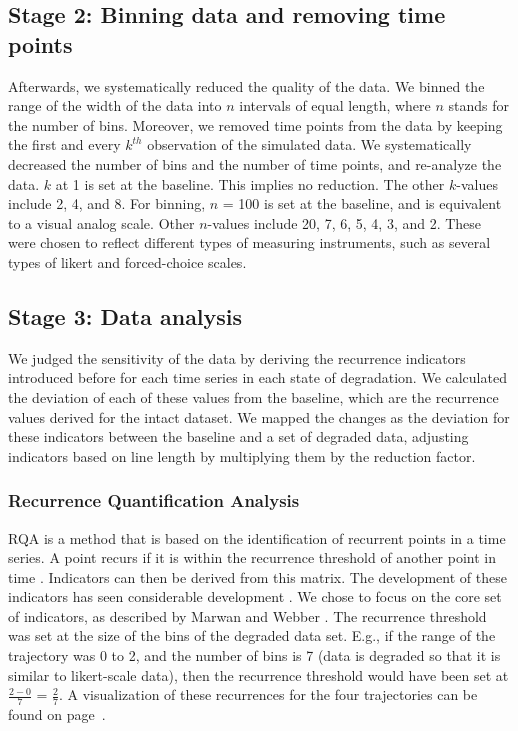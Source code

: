 \documentclass[utf8]{FrontiersinVancouver}
\begin{document}
\subsection{Stage 2: Binning data and removing time points}
Afterwards, we systematically reduced the quality of the data. We binned the range of the width of the data into $n$ intervals of equal length, where $n$ stands for the number of bins. Moreover, we removed time points from the data by keeping the first and every $k^{th}$ observation of the simulated data.
We systematically decreased the number of bins and the number of time points, and re-analyze the data. $k$ at 1 is set at the baseline. This implies no reduction. The other $k$-values include 2, 4, and 8. For binning, $n$ = 100 is set at the baseline, and is equivalent to a visual analog scale. Other $n$-values include 20, 7, 6, 5, 4, 3, and 2. These were chosen to reflect different types of measuring instruments, such as several types of likert and forced-choice scales.

\subsection{Stage 3: Data analysis}
We judged the sensitivity of the data by deriving the recurrence indicators introduced before for each time series in each state of degradation. We calculated the deviation of each of these values from the baseline, which are the recurrence values derived for the intact dataset. We mapped the changes as the deviation for these indicators between the baseline and a set of degraded data, adjusting indicators based on line length by multiplying them by the reduction factor.

\subsubsection{Recurrence Quantification Analysis}
RQA is a method that is based on the identification of recurrent points in a time series. A point recurs if it is within the recurrence threshold of another point in time \citep{webber2005recurrence}. Indicators can then be derived from this matrix. The development of these indicators has seen considerable development \citep{marwanTrendsRecurrenceAnalysis2023}. We chose to focus on the core set of indicators, as described by Marwan and Webber \citep{marwanMathematicalComputationalFoundations2015}. The recurrence threshold was set at the size of the bins of the degraded data set. E.g., if the range of the trajectory was 0 to 2, and the number of bins is 7 (data is degraded so that it is similar to likert-scale data), then the recurrence threshold would have been set at $\frac{2-0}{7}$ = $\frac{2}{7}$. A visualization of these recurrences for the four trajectories can be found on page~\pageref{fig:2}.
\end{document}

